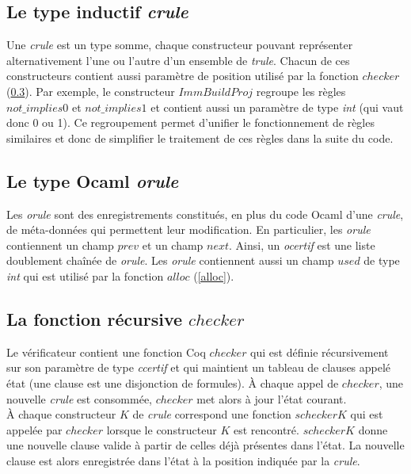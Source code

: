 \documentclass[11pt]{article}
\begin{document}
\subsection{Le type inductif \textit{crule}}\label{regroupement}

Une \textit{crule} est un type somme, chaque constructeur pouvant représenter alternativement l'une ou l'autre d'un ensemble de \textit{trule}. Chacun de ces constructeurs contient aussi paramètre de position utilisé par la fonction $checker$ (\ref{checker}). Par exemple, le constructeur $ImmBuildProj$ regroupe les règles $not\_implies0$ et $not\_implies1$ et contient aussi un paramètre de type \textit{int} (qui vaut donc 0 ou 1). Ce regroupement permet d'unifier le fonctionnement de règles similaires et donc de simplifier le traitement de ces règles dans la suite du code.

\subsection{Le type Ocaml \textit{orule}}

 Les \textit{orule} sont des enregistrements constitués, en plus du code Ocaml d'une \textit{crule}, de méta-données qui permettent leur modification. En particulier, les \textit{orule} contiennent un champ $prev$ et un champ $next$. Ainsi, un \textit{ocertif} est une liste doublement chaînée de \textit{orule}. Les \textit{orule} contiennent aussi un champ $used$ de type \textit{int} qui est utilisé par la fonction $alloc$ (\ref{alloc}).

\subsection{La fonction récursive $checker$} \label{checker}

Le vérificateur contient une fonction Coq $checker$ qui est définie récursivement sur son paramètre de type \textit{ccertif} et qui maintient un tableau de clauses appelé état (une clause est une disjonction de formules). À chaque appel de $checker$, une nouvelle \textit{crule} est consommée, $checker$ met alors à jour l'état courant.\\

À chaque constructeur $K$ de \textit{crule} correspond une fonction $scheckerK$ qui est appelée par $checker$ lorsque le constructeur $K$ est rencontré. $scheckerK$ donne une nouvelle clause valide à partir de celles déjà présentes dans l'état. La nouvelle clause est alors enregistrée dans l'état à la position indiquée par la \textit{crule}.\\
\end{document}
